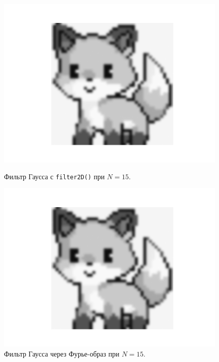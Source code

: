 \documentclass[a4paper]{article}
\begin{document}
\begin{figure}[H]
  \centering
  \begin{minipage}{0.49\textwidth}
    \centering
    \includegraphics[width=\textwidth]{src/gauss_15.png}
    \caption{Фильтр Гаусса с \texttt{filter2D()} при $N=15$.}
  \end{minipage}
  \begin{minipage}{0.49\textwidth}
    \centering
    \includegraphics[width=\textwidth]{src/ifft_gauss_15.png}
    \caption{Фильтр Гаусса через Фурье-образ при $N=15$.}
  \end{minipage}
\end{figure}
\end{document}
